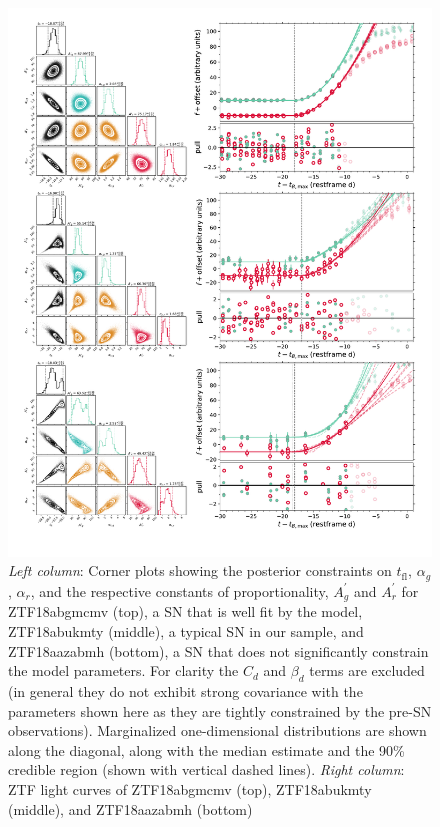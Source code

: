 \documentclass[twocolumn]{./aastex63}
\newcommand{\tfl}{$t_\mathrm{fl}$}
\begin{document}
\begin{figure}
    \centering
    \includegraphics[width=5.75in]{./figures/corner_LC.pdf}
    \caption{\textit{Left column}: Corner plots showing the posterior
    constraints on \tfl, $\alpha_g$, $\alpha_r$, and the respective constants of
    proportionality, $A_g^\prime$ and $A_r^\prime$ for ZTF18abgmcmv (top), a SN
    that is well fit by the model, ZTF18abukmty (middle), a typical SN in our
    sample, and ZTF18aazabmh (bottom), a SN that does not significantly
    constrain the model parameters. For clarity the $C_d$ and $\beta_d$ terms
    are excluded (in general they do not exhibit strong covariance with the
    parameters shown here as they are tightly constrained by the pre-SN
    observations). Marginalized one-dimensional distributions are shown along
    the diagonal, along with the median estimate and the 90\% credible region
    (shown with vertical dashed lines). \textit{Right column}: ZTF light curves
    of ZTF18abgmcmv (top), ZTF18abukmty (middle), and ZTF18aazabmh (bottom)
}
\end{figure}
\end{document}
